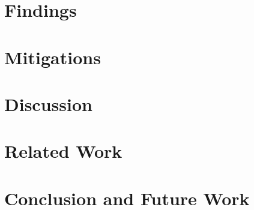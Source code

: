 \documentclass[conference]{IEEEtran}
\begin{document}
\section{Findings}\label{sec:findings}


\section{Mitigations}\label{sec:mitigations}


\section{Discussion}\label{sec:discuss}


\section{Related Work}\label{sec:related}


\section{Conclusion and Future Work}\label{sec:conclusion}



{}

\end{document}
